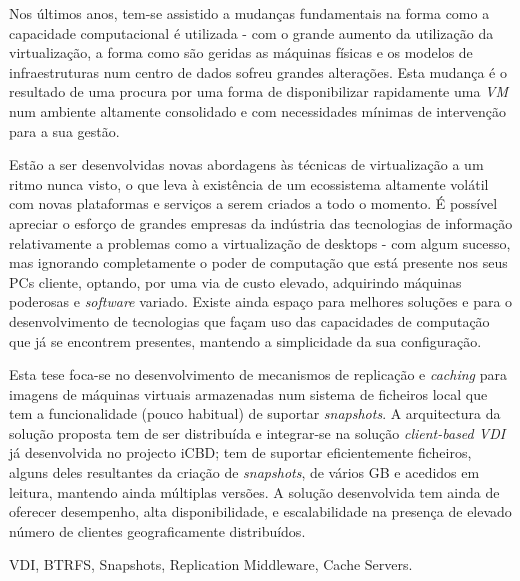 
Nos últimos anos, tem-se assistido a mudanças fundamentais na forma como a capacidade computacional é utilizada - com o grande aumento da utilização da virtualização, a forma como são geridas as máquinas físicas e os modelos de infraestruturas num centro de dados sofreu grandes alterações. Esta mudança é o resultado de uma procura por uma forma de disponibilizar rapidamente uma \textit{VM} num ambiente altamente consolidado e com necessidades mínimas de intervenção para a sua gestão.

Estão a ser desenvolvidas novas abordagens às técnicas de virtualização a um ritmo nunca visto, o que leva à existência de um ecossistema altamente volátil com novas plataformas e serviços a serem criados a todo o momento. É possível apreciar o esforço de grandes empresas da indústria das tecnologias de informação relativamente a problemas como a virtualização de desktops - com algum sucesso, mas ignorando completamente o poder de computação que está presente nos seus PCs cliente, optando, por uma via de custo elevado, adquirindo máquinas poderosas e \textit{software} variado. Existe ainda espaço para melhores soluções e para o desenvolvimento de tecnologias que façam uso das capacidades de computação que já se encontrem presentes, mantendo a simplicidade da sua configuração.

Esta tese foca-se no desenvolvimento de mecanismos de replicação e \textit{caching} para imagens de máquinas virtuais armazenadas num sistema de ficheiros local que tem a funcionalidade (pouco habitual) de suportar \textit{snapshots}. A arquitectura da solução proposta tem de ser distribuída e integrar-se na solução \textit{client-based VDI} já desenvolvida no projecto iCBD; tem de suportar eficientemente ficheiros, alguns deles resultantes da criação de \textit{snapshots}, de vários GB e acedidos em leitura, mantendo ainda múltiplas versões. A solução desenvolvida tem ainda de oferecer desempenho, alta disponibilidade, e escalabilidade na presença de elevado número de clientes geograficamente distribuídos.



\begin{keywords}
	VDI, BTRFS, Snapshots, Replication Middleware, Cache Servers.
\end{keywords}
